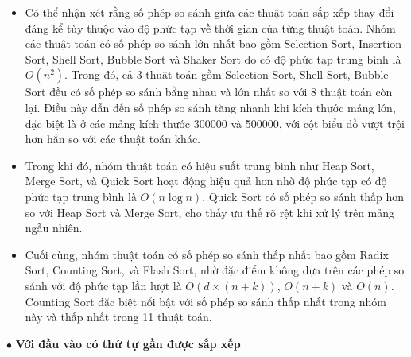 \begin{itemize}[label=$\circ$]
    \item Có thể nhận xét rằng số phép so sánh giữa các thuật toán sắp 
    xếp thay đổi đáng kể tùy thuộc vào độ phức tạp về thời gian của từng 
    thuật toán. Nhóm các thuật toán có số phép so sánh lớn nhất bao gồm 
    Selection Sort, Insertion Sort, Shell Sort, Bubble Sort và Shaker 
    Sort do có độ phức tạp trung bình là $O\left(n^2\right)$. Trong đó, 
    cả 3 thuật toán gồm Selection Sort, Shell Sort, Bubble Sort đều có 
    số phép so sánh bằng nhau và lớn nhất so với 8 thuật toán còn lại. 
    Điều này dẫn đến số phép so sánh tăng nhanh khi kích thước mảng lớn, 
    đặc biệt là ở các mảng kích thước 300000 và 500000, với cột biểu đồ 
    vượt trội hơn hẳn so với các thuật toán khác.
\end{itemize}

\pagebreak

\begin{itemize}[label=$\circ$]
	\item Trong khi đó, nhóm thuật toán có hiệu suất trung bình như Heap 
    Sort, Merge Sort, và Quick Sort hoạt động hiệu quả hơn nhờ độ phức 
    tạp có độ phức tạp trung bình là $O\left(n\log{n}\right)$. Quick Sort 
    có số phép so sánh thấp hơn so với Heap Sort và Merge Sort, cho thấy 
    ưu thế rõ rệt khi xử lý trên mảng ngẫu nhiên.
	\item Cuối cùng, nhóm thuật toán có số phép so sánh thấp nhất bao 
    gồm Radix Sort, Counting Sort, và Flash Sort, nhờ đặc điểm không dựa 
    trên các phép so sánh với độ phức tạp lần lượt là $O\left(d\times\left(n+k\right)\right)$, 
    $O\left(n+k\right)$ và $O\left(n\right)$. Counting Sort đặc biệt nổi bật với 
    số phép so sánh thấp nhất trong nhóm này và thấp nhất trong 11 thuật 
    toán.
\end{itemize}

$\bullet$ \textbf{Với đầu vào có thứ tự gần được sắp xếp}

